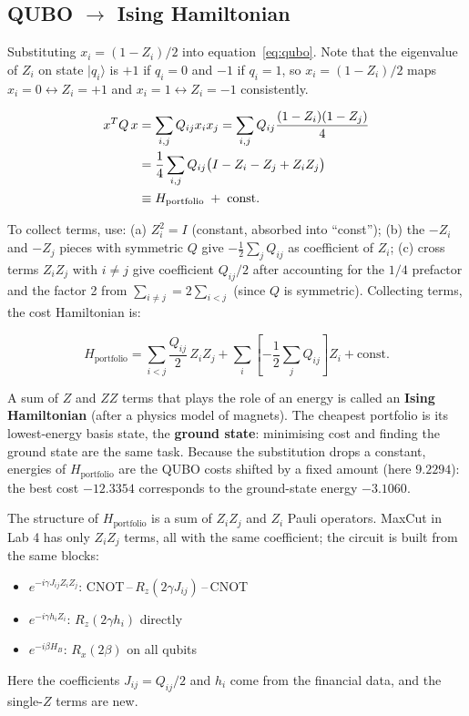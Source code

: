 \documentclass[a4paper,11pt]{article}
\begin{document}
\subsection{QUBO $\to$ Ising Hamiltonian}

Substituting $x_i = (1 - Z_i)/2$ into equation~\eqref{eq:qubo}.
Note that the eigenvalue of $Z_i$ on state $|q_i\rangle$ is $+1$ if $q_i=0$ and
$-1$ if $q_i=1$, so $x_i=(1-Z_i)/2$ maps $x_i=0\leftrightarrow Z_i=+1$ and
$x_i=1\leftrightarrow Z_i=-1$ consistently.

\begin{align}
    x^T Q\, x &= \sum_{i,j} Q_{ij} x_i x_j
    = \sum_{i,j} Q_{ij} \frac{(1-Z_i)(1-Z_j)}{4} \notag\\
    &= \frac{1}{4}\sum_{i,j} Q_{ij}
    \bigl(I - Z_i - Z_j + Z_iZ_j\bigr) \notag\\
    &\equiv H_\text{portfolio} \;+\; \text{const.}
    \label{eq:ising-map}
\end{align}

To collect terms, use: (a) $Z_i^2 = I$ (constant, absorbed into ``const'');
(b) the $-Z_i$ and $-Z_j$ pieces with symmetric $Q$ give $-\frac{1}{2}\sum_j Q_{ij}$
as coefficient of $Z_i$; (c) cross terms $Z_iZ_j$ with $i\neq j$ give coefficient
$Q_{ij}/2$ after accounting for the $1/4$ prefactor and the factor 2 from
$\sum_{i\neq j} = 2\sum_{i<j}$ (since $Q$ is symmetric).
Collecting terms, the cost Hamiltonian is:

\begin{equation}
    H_\text{portfolio}
    = \sum_{i<j} \frac{Q_{ij}}{2}\, Z_iZ_j
    + \sum_i \left[-\frac{1}{2}\sum_j Q_{ij}\right] Z_i
    + \text{const.}
    \label{eq:H-portfolio}
\end{equation}

A sum of $Z$ and $ZZ$ terms that plays the role of an energy is called an
\textbf{Ising Hamiltonian} (after a physics model of magnets). The cheapest
portfolio is its lowest-energy basis state, the \textbf{ground state}:
minimising cost and finding the ground state are the same task. Because the
substitution drops a constant, energies of $H_\text{portfolio}$ are the QUBO
costs shifted by a fixed amount (here $9.2294$): the best cost $-12.3354$
corresponds to the ground-state energy $-3.1060$.

\begin{bridgebox}
The structure of $H_\text{portfolio}$ is a sum of $Z_iZ_j$ and $Z_i$
Pauli operators. MaxCut in Lab 4 has only $Z_iZ_j$ terms, all with the
same coefficient; the circuit is built from the same blocks:
\begin{itemize}
    \item $e^{-i\gamma J_{ij} Z_i Z_j}$: CNOT\,--\,$R_z(2\gamma J_{ij})$\,--\,CNOT
    \item $e^{-i\gamma h_i Z_i}$: $R_z(2\gamma h_i)$ directly
    \item $e^{-i\beta H_B}$: $R_x(2\beta)$ on all qubits
\end{itemize}
Here the coefficients $J_{ij} = Q_{ij}/2$ and $h_i$ come from the financial
data, and the single-$Z$ terms are new.
\end{bridgebox}
\end{document}
